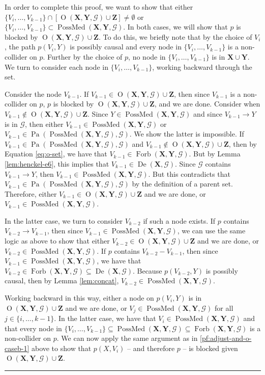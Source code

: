 \documentclass[twoside]{article}
\DeclareMathOperator{\Pa}{Pa}
\DeclareMathOperator{\De}{De}
\DeclareMathOperator{\Forb}{Forb}
\newcommand{\fb}[2][X,Y]{\Forb(\mb{#1},#2)}
\DeclareMathOperator{\PossMediators}{PossMed}
\newcommand{\possmediatb}[2][X,Y]{\PossMediators(\mb{#1},#2)}
\DeclareMathOperator{\Opt}{O}
\newcommand{\optb}[2][X,Y]{\Opt(\mb{#1},#2)}
\newcommand{\mb}[1]{\mathbf{#1}}
\newcommand{\g}[1][G]{\mathcal{#1}}
\newenvironment{proofof}[1][]{\begin{trivlist}
\item[\hskip \labelsep {\bfseries Proof of #1.}]}{\hfill\BlackBox\end{trivlist}}
\newcommand{\BlackBox}{\rule{1.5ex}{1.5ex}}
\begin{document}
\begin{proofof}[Theorem \ref{thm:adjust-and-o}]
\begin{enumerate}[label = (\arabic*)]
            In order to complete this proof, we want to show that either $\{V_i, \dots, V_{k-1}\} \cap [\optb{\g} \cup \mb{Z}] \neq \emptyset$ or $\{V_i, \dots, V_{k-1}\} \subset \possmediatb{\g}$. In both cases, we will show that $p$ is blocked by $\optb{\g} \cup \mb{Z}$. To do this, we briefly note that by the choice of $V_i$, the path $p(V_i, Y)$ is possibly causal and every node in $\{V_i, \dots, V_{k-1}\}$ is a non-collider on $p$. Further by the choice of $p$, no node in $\{V_i, \dots, V_{k-1}\}$ is in $\mb{X} \cup \mb{Y}$. We turn to consider each node in $\{V_i, \dots, V_{k-1}\}$, working backward through the set.

            Consider the node $V_{k-1}$. If $V_{k-1} \in \optb{\g} \cup \mb{Z}$, then since $V_{k-1}$ is a non-collider on $p$, $p$ is blocked by $\optb{\g} \cup \mb{Z}$, and we are done. Consider when $V_{k-1} \notin \optb{\g} \cup \mb{Z}$. Since $Y \in \possmediatb{\g}$ and since $V_{k-1} \to Y$ is in $\g$, then either $V_{k-1} \in \possmediatb{\g}$ or $V_{k-1} \in \Pa(\possmediatb{\g},\g)$. We show the latter is impossible. If $V_{k-1} \in \Pa(\possmediatb{\g},\g)$ and $V_{k-1} \notin \optb{\g} \cup \mb{Z}$, then by Equation \eqref{eq:o-set}, we have that $V_{k-1} \in \fb{\g}$. But by Lemma \ref{lem:henckel-e6}, this implies that $V_{k-1} \in \De(\mb{X},\g)$. Since $\g$ contains $V_{k-1} \to Y$, then $V_{k-1} \in \possmediatb{\g}$. But this contradicts that $V_{k-1} \in \Pa(\possmediatb{\g},\g)$ by the definition of a parent set. Therefore, either $V_{k-1} \in \optb{\g} \cup \mb{Z}$ and we are done, or $V_{k-1} \in \possmediatb{\g}$.
            
            In the latter case, we turn to consider $V_{k-2}$ if such a node exists. If $p$ contains $V_{k-2} \to V_{k-1}$, then since $V_{k-1} \in \possmediatb{\g}$, we can use the same logic as above to show that either $V_{k-2} \in \optb{\g} \cup \mb{Z}$ and we are done, or $V_{k-2} \in \possmediatb{\g}$. If $p$ contains $V_{k-2} - V_{k-1}$, then since $V_{k-1} \in \possmediatb{\g}$, we have that $V_{k-2} \in \fb{\g} \subseteq \De(\mb{X},\g)$. Because $p(V_{k-2},Y)$ is possibly causal, then by Lemma \ref{lem:concat}, $V_{k-2} \in \possmediatb{\g}$.
            
            Working backward in this way, either a node on $p(V_i, Y)$ is in $\optb{\g} \cup \mb{Z}$ and we are done, or $V_j \in \possmediatb{\g}$ for all $j \in \{i, \dots, k-1\}$. In the latter case, we have that $V_i \in \possmediatb{\g}$ and that every node in $\{V_i, \dots, V_{k-1}\} \subseteq \possmediatb{\g} \subseteq \fb{\g}$ is a non-collider on $p$. We can now apply the same argument as in \ref{pf:adjust-and-o-caseb-1} above to show that $p(X,V_i)$ -- and therefore $p$ -- is blocked given $\optb{\g} \cup \mb{Z}$. 
       \end{enumerate}
\end{proofof}
\end{document}

